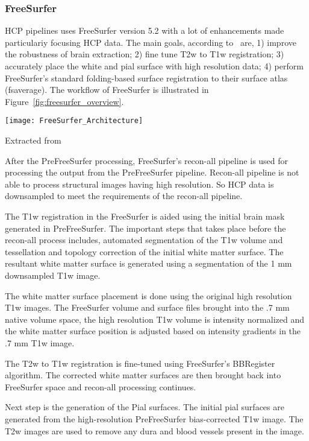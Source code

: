 \subsubsection{FreeSurfer}
HCP pipelines uses FreeSurfer version 5.2 with a lot of enhancements made particulariy focusing HCP data. The main goals, according to~\cite{Gla13} are, 1) improve the robustness of brain extraction; 2) fine tune T2w to T1w registration; 3) accurately place the white and pial surface with high resolution data; 4) perform FreeSurfer's standard folding-based surface registration to their surface atlas (fsaverage). The workflow of FreeSurfer is illustrated in Figure~\ref{fig:freesurfer_overview}.

\begin{center}
  \texttt{[image: FreeSurfer\_Architecture]}
  \label{fig:freesurfer_overview}
  \caption*{Extracted from \cite{Gla13}}
\end{center}

After the PreFreeSurfer processing, FreeSurfer's recon-all pipeline is used for processing the output from the PreFreeSurfer pipeline. Recon-all pipeline is not able to process structural images having high resolution. So HCP data is downsampled to meet the requirements of the recon-all pipeline.

The T1w registration in the FreeSurfer is aided using the initial brain mask generated in PreFreeSurfer. The important steps that takes place before the recon-all process includes, automated segmentation of the T1w volume and tessellation and topology correction of the initial white matter surface. The resultant white matter surface is generated using a segmentation of the 1 mm downsampled T1w image.

The white matter surface placement is done using the original high resolution T1w images. The FreeSurfer volume and surface files brought into the .7 mm native volume space, the high resolution T1w volume is intensity normalized and the white matter surface position is adjusted based on intensity gradients in the .7 mm T1w image.

The T2w to T1w registration is fine-tuned using FreeSurfer's BBRegister algorithm. The corrected white matter surfaces are then brought back into FreeSurfer space and recon-all processing continues.

Next step is the generation of the Pial surfaces. The initial pial surfaces are generated from the high-resolution PreFreeSurfer bias-corrected T1w image.
The T2w images are used to remove any dura and blood vessels present in the image.

